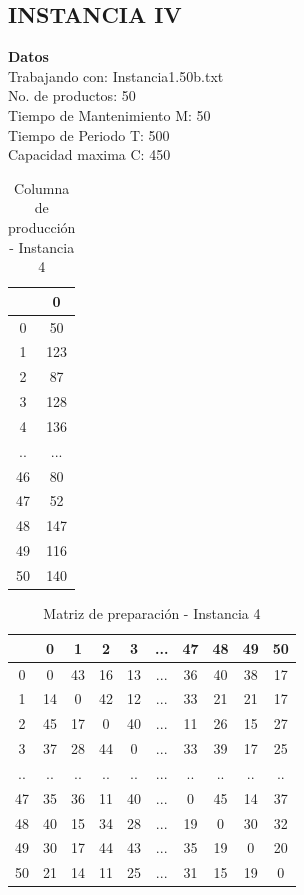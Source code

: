 \documentclass[twocolumn,10pt]{article}
\begin{document}
\subsection{INSTANCIA IV}


\textbf{Datos}\\
Trabajando con:  Instancia1.50b.txt\\
No. de productos: 50\\
Tiempo de Mantenimiento M: 50\\
Tiempo de Periodo T: 500\\
Capacidad maxima C: 450\\



\begin{table}[h!]
\centering
\begin{tabular}{||c c||} 
 \hline
  &0 \\
\hline
   
0& 50\\
1&123\\
2& 87\\
3&128\\
4&136\\
..&...\\
46&80\\
47&52\\
48&147\\
49&116\\
50&140\\


\hline

\end{tabular}
\caption{Columna de producción - Instancia 4}
\label{table:1}
\end{table}

\begin{table}[h!]
\centering
\begin{tabular}{||c c c c c c c c c c||} 
 \hline
  &0 &  1 &  2 &  3  & ... &47&  48&  49&  50\\  
\hline
    
0& 0&43&16&13&...&36&40&38&17\\
1&14&0&42&12&...&33&21&21&17\\
2&45&17&0&40&...&11&26&15&27\\
3&37&28&44&0&...&33&39&17&25\\
..&..&..&..&..&...&..&..&..&..\\
47&35&36&11&40&...&0&45&14&37\\
48&40&15&34&28&...&19&0&30&32\\
49&30&17&44&43&...&35&19&0&20\\
50&21&14&11&25&...&31&15&19&0\\


\hline

\end{tabular}
\caption{Matriz de preparación - Instancia 4}
\label{table:1}
\end{table}
\end{document}
